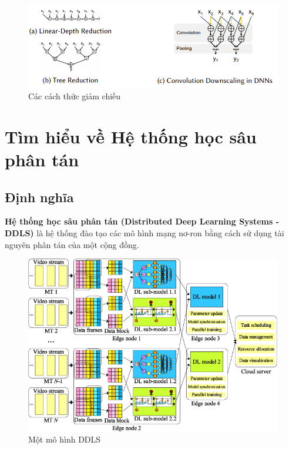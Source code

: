 \documentclass[11pt,a4paper]{article}
\numberwithin{equation}{subsection}
\numberwithin{figure}{subsection}
\numberwithin{table}{subsection}
\begin{document}
\begin{figure}[!h]
\begin{center}
\includegraphics[scale=0.8]{parallel_Deep_3.PNG}
\end{center}
\caption{Các cách thức giảm chiều}
\end{figure}

\newpage
\section{Tìm hiểu về Hệ thống học sâu phân tán}
\subsection{Định nghĩa}
\textbf{Hệ thống học sâu phân tán (Distributed Deep Learning Systems - DDLS)} là hệ thống đào tạo các mô hình mạng nơ-ron bằng cách sử dụng tài nguyên phân tán của một cộng đồng.\\

\begin{figure}[!h]
\begin{center}
\includegraphics[scale=0.6]{DDLS.png}
\end{center}
\caption{Một mô hình DDLS}
\end{figure}
\end{document}
